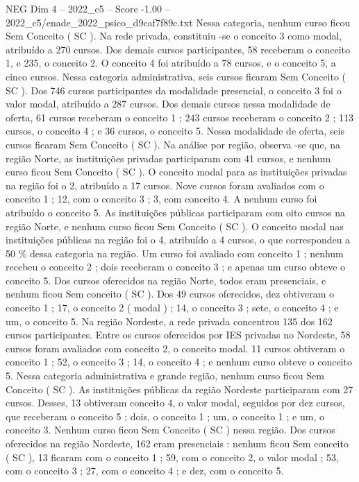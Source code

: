 \begin{textsample}{NEG Dim 4 – 2022\_c5 – Score -1.00 – 2022\_c5/enade\_2022\_psico\_d9caf7f89c.txt}
Nessa categoria, nenhum curso ficou Sem Conceito ( SC ).
Na rede privada, constituiu -se o conceito 3 como modal, atribuído a 270 cursos.
Dos demais cursos participantes, 58 receberam o conceito 1, e 235, o conceito 2.
O conceito 4 foi atribuído a 78 cursos, e o conceito 5, a cinco cursos.
Nessa categoria administrativa, seis cursos ficaram Sem Conceito ( SC ).
Dos 746 cursos participantes da modalidade presencial, o conceito 3 foi o valor modal, atribuído a 287 cursos.
Dos demais cursos nessa modalidade de oferta, 61 cursos receberam o conceito 1 ; 243 cursos receberam o conceito 2 ; 113 cursos, o conceito 4 ; e 36 cursos, o conceito 5.
Nessa modalidade de oferta, seis cursos ficaram Sem Conceito ( SC ).
Na análise por região, observa -se que, na região Norte, as instituições privadas participaram com 41 cursos, e nenhum curso ficou Sem Conceito ( SC ).
O conceito modal para as instituições privadas na região foi o 2, atribuído a 17 cursos.
Nove cursos foram avaliados com o conceito 1 ; 12, com o conceito 3 ; 3, com conceito 4.
A nenhum curso foi atribuído o conceito 5.
As instituições públicas participaram com oito cursos na região Norte, e nenhum curso ficou Sem Conceito ( SC ).
O conceito modal nas instituições públicas na região foi o 4, atribuído a 4 cursos, o que correspondeu a 50 \% dessa categoria na região.
Um curso foi avaliado com conceito 1 ; nenhum recebeu o conceito 2 ; dois receberam o conceito 3 ; e apenas um curso obteve o conceito 5.
Dos cursos oferecidos na região Norte, todos eram presenciais, e nenhum ficou Sem conceito ( SC ).
Dos 49 cursos oferecidos, dez obtiveram o conceito 1 ; 17, o conceito 2 ( modal ) ; 14, o conceito 3 ; sete, o conceito 4 ; e um, o conceito 5.
Na região Nordeste, a rede privada concentrou 135 dos 162 cursos participantes.
Entre os cursos oferecidos por IES privadas no Nordeste, 58 cursos foram avaliados com conceito 2, o conceito modal. 11 cursos obtiveram o conceito 1 ; 52, o conceito 3 ; 14, o conceito 4 ; e nenhum curso obteve o conceito 5.
Nessa categoria administrativa e grande região, nenhum curso ficou Sem Conceito ( SC ).
As instituições públicas da região Nordeste participaram com 27 cursos.
Desses, 13 obtiveram conceito 4, o valor modal, seguidos por dez cursos, que receberam o conceito 5 ; dois, o conceito 1 ; um, o conceito 1 ; e um, o conceito 3.
Nenhum curso ficou Sem Conceito ( SC ) nessa região.
Dos cursos oferecidos na região Nordeste, 162 eram presenciais : nenhum ficou Sem conceito ( SC ), 13 ficaram com o conceito 1 ; 59, com o conceito 2, o valor modal ; 53, com o conceito 3 ; 27, com o conceito 4 ; e dez, com o conceito 5.

\end{textsample}
